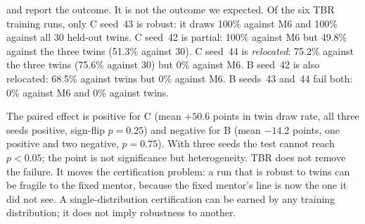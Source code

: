 \documentclass[conference]{IEEEtran}
\begin{document}
 and  report the outcome. It is not the outcome we expected. Of the six TBR training runs, only C seed~43 is robust: it draws 100\% against M6 and 100\% against all 30 held-out twins. C seed~42 is partial: 100\% against M6 but 49.8\% against the three twins (51.3\% against 30). C seed~44 is \emph{relocated}: 75.2\% against the three twins (75.6\% against 30) but 0\% against M6. B seed~42 is also relocated: 68.5\% against twins but 0\% against M6. B seeds~43 and~44 fail both: 0\% against M6 and 0\% against twins.

The paired effect is positive for C (mean $+50.6$ points in twin draw rate, all three seeds positive, sign-flip $p=0.25$) and negative for B (mean $-14.2$ points, one positive and two negative, $p=0.75$). With three seeds the test cannot reach $p<0.05$; the point is not significance but heterogeneity. TBR does not remove the failure. It moves the certification problem: a run that is robust to twins can be fragile to the fixed mentor, because the fixed mentor's line is now the one it did not see. A single-distribution certification can be earned by any training distribution; it does not imply robustness to another.
\end{document}
